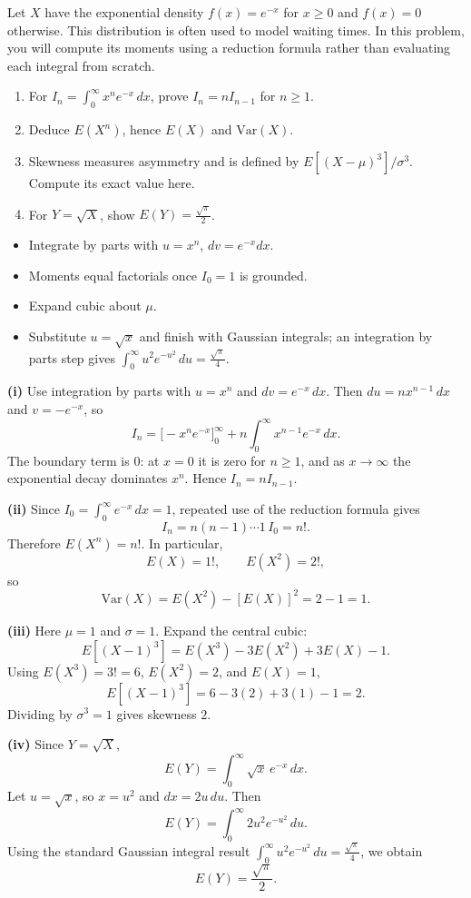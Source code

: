 
\begin{problem}
Let $X$ have the exponential density $f(x)=e^{-x}$ for $x\ge0$ and $f(x)=0$ otherwise. This distribution is often used to model waiting times. In this problem, you will compute its moments using a reduction formula rather than evaluating each integral from scratch.
\begin{enumerate}[label=\textbf{(\roman*)}]
  \item For $I_{n}=\int_{0}^{\infty}x^{n}e^{-x}\,dx$, prove $I_{n}=nI_{n-1}$ for $n\ge 1$.
  \item Deduce $E(X^{n})$, hence $E(X)$ and $\mathrm{Var}(X)$.
  \item Skewness measures asymmetry and is defined by $E[(X-\mu)^{3}]/\sigma^{3}$. Compute its exact value here.
  \item For $Y=\sqrt{X}$, show $E(Y)=\frac{\sqrt{\pi}}{2}$.
\end{enumerate}
\end{problem}

\begin{hint}
\begin{itemize}[leftmargin=*]
  \item Integrate by parts with $u=x^{n}$, $dv=e^{-x}dx$.
  \item Moments equal factorials once $I_{0}=1$ is grounded.
  \item Expand cubic about $\mu$.
  \item Substitute $u=\sqrt{x}$ and finish with Gaussian integrals; an integration by parts step gives $\int_0^\infty u^2e^{-u^2}\,du=\frac{\sqrt{\pi}}{4}$.
\end{itemize}
\end{hint}

\begin{solution}
\textbf{(i)} Use integration by parts with $u=x^n$ and $dv=e^{-x}\,dx$. Then $du=nx^{n-1}\,dx$ and $v=-e^{-x}$, so
\[
I_n=\big[-x^ne^{-x}\big]_0^\infty+n\int_0^\infty x^{n-1}e^{-x}\,dx.
\]
The boundary term is $0$: at $x=0$ it is zero for $n\ge1$, and as $x\to\infty$ the exponential decay dominates $x^n$. Hence $I_n=nI_{n-1}$.

\textbf{(ii)} Since $I_0=\int_0^\infty e^{-x}\,dx=1$, repeated use of the reduction formula gives
\[
I_n=n(n-1)\cdots 1\,I_0=n!.
\]
Therefore $E(X^n)=n!$. In particular,
\[
E(X)=1!,\qquad E(X^2)=2!,
\]
so
\[
\mathrm{Var}(X)=E(X^2)-[E(X)]^2=2-1=1.
\]

\textbf{(iii)} Here $\mu=1$ and $\sigma=1$. Expand the central cubic:
\[
E[(X-1)^3]=E(X^3)-3E(X^2)+3E(X)-1.
\]
Using $E(X^3)=3!=6$, $E(X^2)=2$, and $E(X)=1$,
\[
E[(X-1)^3]=6-3(2)+3(1)-1=2.
\]
Dividing by $\sigma^3=1$ gives skewness $\boxed{2}$.

\textbf{(iv)} Since $Y=\sqrt X$,
\[
E(Y)=\int_0^\infty \sqrt{x}\,e^{-x}\,dx.
\]
Let $u=\sqrt{x}$, so $x=u^2$ and $dx=2u\,du$. Then
\[
E(Y)=\int_0^\infty 2u^2e^{-u^2}\,du.
\]
Using the standard Gaussian integral result $\int_0^\infty u^2e^{-u^2}\,du=\frac{\sqrt{\pi}}{4}$, we obtain
\[
E(Y)=\boxed{\frac{\sqrt{\pi}}{2}}.
\]
\end{solution}

